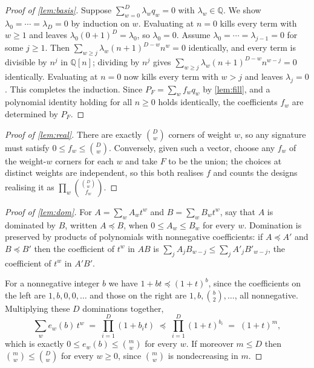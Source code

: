 \documentclass[11pt]{amsart}
\theoremstyle{definition}
\theoremstyle{remark}
\begin{document}
\begin{proof}[Proof of \cref{lem:basis}]
Suppose $\sum_{w=0}^{D}\lambda_{w}q_{w} = 0$ with $\lambda_{w} \in \mathbb{Q}$. We show $\lambda_{0}=\cdots=\lambda_{D}=0$ by induction on $w$. Evaluating at $n=0$ kills every term with $w \ge 1$ and leaves $\lambda_{0}(0+1)^{D}=\lambda_{0}$, so $\lambda_{0}=0$. Assume $\lambda_{0}=\cdots=\lambda_{j-1}=0$ for some $j \ge 1$. Then $\sum_{w \ge j}\lambda_{w}(n+1)^{D-w}n^{w}=0$ identically, and every term is divisible by $n^{j}$ in $\mathbb{Q}[n]$; dividing by $n^{j}$ gives $\sum_{w \ge j}\lambda_{w}(n+1)^{D-w}n^{w-j}=0$ identically. Evaluating at $n=0$ now kills every term with $w>j$ and leaves $\lambda_{j}=0$. This completes the induction. Since $P_{F}=\sum_{w}f_{w}q_{w}$ by \cref{lem:fill}, and a polynomial identity holding for all $n \ge 0$ holds identically, the coefficients $f_{w}$ are determined by $P_{F}$.
\end{proof}

\begin{proof}[Proof of \cref{lem:real}]
There are exactly $\binom{D}{w}$ corners of weight $w$, so any signature must satisfy $0 \le f_{w} \le \binom{D}{w}$. Conversely, given such a vector, choose any $f_{w}$ of the weight-$w$ corners for each $w$ and take $F$ to be the union; the choices at distinct weights are independent, so this both realises $f$ and counts the designs realising it as $\prod_{w}\binom{\binom{D}{w}}{f_{w}}$.
\end{proof}

\begin{proof}[Proof of \cref{lem:dom}]
For $A = \sum_{w}A_{w}t^{w}$ and $B=\sum_{w}B_{w}t^{w}$, say that $A$ is dominated by $B$, written $A \preceq B$, when $0 \le A_{w} \le B_{w}$ for every $w$. Domination is preserved by products of polynomials with nonnegative coefficients: if $A \preceq A'$ and $B \preceq B'$ then the coefficient of $t^{w}$ in $AB$ is $\sum_{j}A_{j}B_{w-j} \le \sum_{j}A'_{j}B'_{w-j}$, the coefficient of $t^{w}$ in $A'B'$.

For a nonnegative integer $b$ we have $1+bt \preceq (1+t)^{b}$, since the coefficients on the left are $1, b, 0, 0, \dots$ and those on the right are $1, b, \binom{b}{2}, \dots$, all nonnegative. Multiplying these $D$ dominations together,
\[
  \sum_{w}e_{w}(b)\,t^{w} \;=\; \prod_{i=1}^{D}(1+b_{i}t) \;\preceq\; \prod_{i=1}^{D}(1+t)^{b_{i}} \;=\; (1+t)^{m},
\]
which is exactly $0 \le e_{w}(b) \le \binom{m}{w}$ for every $w$. If moreover $m \le D$ then $\binom{m}{w} \le \binom{D}{w}$ for every $w \ge 0$, since $\binom{m}{w}$ is nondecreasing in $m$.
\end{proof}
\end{document}
